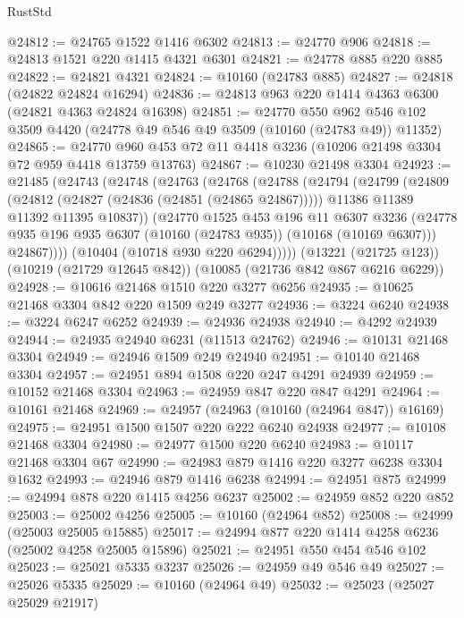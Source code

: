 \begin{lexlean}{RustStd}
\begin{coremodule}
@24812 := @24765 @1522 @1416 @6302
@24813 := @24770 @906
@24818 := @24813 @1521 @220 @1415 @4321 @6301
@24821 := @24778 @885 @220 @885
@24822 := @24821 @4321
@24824 := @10160 (@24783 @885)
@24827 := @24818 (@24822 @24824 @16294)
@24836 := @24813 @963 @220 @1414 @4363 @6300 (@24821 @4363 @24824 @16398)
@24851 := @24770
    @550
    @962
    @546
    @102
    @3509
    @4420
    (@24778 @49 @546 @49 @3509 (@10160 (@24783 @49)) @11352)
@24865 := @24770 @960 @453 @72 @11 @4418 @3236 (@10206 @21498 @3304 @72 @959 @4418 @13759 @13763)
@24867 := @10230 @21498 @3304
@24923 := @21485
    (@24743
      (@24748
        (@24763
          (@24768
            (@24788
              (@24794
                (@24799
                  (@24809
                    (@24812 (@24827 (@24836 (@24851 (@24865 @24867)))))
                    @11386
                    @11389
                    @11392
                    @11395
                    @10837))
                (@24770
                  @1525
                  @453
                  @196
                  @11
                  @6307
                  @3236
                  (@24778 @935 @196 @935 @6307 (@10160 (@24783 @935)) (@10168 (@10169 @6307)))
                  @24867))))
          (@10404 (@10718 @930 @220 @6294)))))
    (@13221 (@21725 @123))
    (@10219 (@21729 @12645 @842))
    (@10085 (@21736 @842 @867 @6216 @6229))
@24928 := @10616 @21468 @1510 @220 @3277 @6256
@24935 := @10625 @21468 @3304 @842 @220 @1509 @249 @3277
@24936 := @3224 @6240
@24938 := @3224 @6247 @6252
@24939 := @24936 @24938
@24940 := @4292 @24939
@24944 := @24935 @24940 @6231 (@11513 @24762)
@24946 := @10131 @21468 @3304
@24949 := @24946 @1509 @249 @24940
@24951 := @10140 @21468 @3304
@24957 := @24951 @894 @1508 @220 @247 @4291 @24939
@24959 := @10152 @21468 @3304
@24963 := @24959 @847 @220 @847 @4291
@24964 := @10161 @21468
@24969 := @24957 (@24963 (@10160 (@24964 @847)) @16169)
@24975 := @24951 @1500 @1507 @220 @222 @6240 @24938
@24977 := @10108 @21468 @3304
@24980 := @24977 @1500 @220 @6240
@24983 := @10117 @21468 @3304 @67
@24990 := @24983 @879 @1416 @220 @3277 @6238 @3304 @1632
@24993 := @24946 @879 @1416 @6238
@24994 := @24951 @875
@24999 := @24994 @878 @220 @1415 @4256 @6237
@25002 := @24959 @852 @220 @852
@25003 := @25002 @4256
@25005 := @10160 (@24964 @852)
@25008 := @24999 (@25003 @25005 @15885)
@25017 := @24994 @877 @220 @1414 @4258 @6236 (@25002 @4258 @25005 @15896)
@25021 := @24951 @550 @454 @546 @102
@25023 := @25021 @5335 @3237
@25026 := @24959 @49 @546 @49
@25027 := @25026 @5335
@25029 := @10160 (@24964 @49)
@25032 := @25023 (@25027 @25029 @21917)

\end{coremodule}
\end{lexlean}
